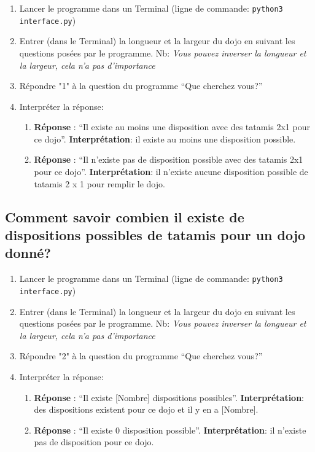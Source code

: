 \begin{enumerate}
    \item Lancer le programme dans un Terminal (ligne de commande: \texttt{python3 interface.py})
    \item Entrer (dans le Terminal) la longueur et la largeur du dojo en suivant les questions posées par
          le programme. Nb: \textit{Vous pouvez inverser la longueur et la largeur, cela n’a pas d’importance}
    \item Répondre "1" à la question du programme “Que cherchez vous?”
    \item Interpréter la réponse:
          \begin{enumerate}
              \item \textbf{Réponse} : “Il existe au moins une disposition avec des tatamis 2x1 pour ce dojo”.
                    \textbf{Interprétation}: il existe au moins une disposition possible.
              \item \textbf{Réponse} : “Il n'existe pas de disposition possible avec des tatamis 2x1 pour ce dojo”.
                    \textbf{Interprétation}: il n’existe aucune disposition possible de tatamis 2 x 1 pour remplir le dojo.
          \end{enumerate}
\end{enumerate}



\subsection{Comment savoir combien il existe de dispositions possibles de tatamis pour un dojo donné?}

\begin{enumerate}
    \item Lancer le programme dans un Terminal (ligne de commande: \texttt{python3 interface.py})
    \item Entrer (dans le Terminal) la longueur et la largeur du dojo en suivant les questions posées par
          le programme. Nb: \textit{Vous pouvez inverser la longueur et la largeur, cela n’a pas d’importance}
    \item Répondre "2" à la question du programme “Que cherchez vous?”
    \item Interpréter la réponse:
          \begin{enumerate}
              \item \textbf{Réponse} : “Il existe [Nombre] dispositions possibles”.
                    \textbf{Interprétation}: des dispositions existent pour ce dojo et il y en a [Nombre].
              \item \textbf{Réponse} : “Il existe 0 disposition possible”.
                    \textbf{Interprétation}: il n’existe pas de disposition pour ce dojo.
          \end{enumerate}
\end{enumerate}



